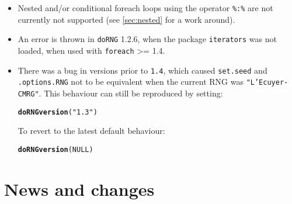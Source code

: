 \documentclass[a4paper,12pt]{article}\usepackage{graphicx, color}
\makeatletter
\newcommand{\hlfunctioncall}[1]{\textcolor[rgb]{0.501960784313725,0,0.329411764705882}{\textbf{#1}}}%
\newcommand{\hlstring}[1]{\textcolor[rgb]{0.6,0.6,1}{#1}}%
\newenvironment{kframe}{%
 \def\at@end@of@kframe{}%
 \ifinner\ifhmode%
  \def\at@end@of@kframe{\end{minipage}}%
  \begin{minipage}{\columnwidth}%
 \fi\fi%
 \def\FrameCommand##1{\hskip\@totalleftmargin \hskip-\fboxsep
 \colorbox{shadecolor}{##1}\hskip-\fboxsep
     \hskip-\linewidth \hskip-\@totalleftmargin \hskip\columnwidth}%
 \MakeFramed {\advance\hsize-\width
   \@totalleftmargin\z@ \linewidth\hsize
   \@setminipage}}%
 {\par\unskip\endMakeFramed%
 \at@end@of@kframe}
\newenvironment{knitrout}{}{} %
\renewenvironment{knitrout}{\begin{footnotesize}}{\end{footnotesize}}
\let\code=\texttt
\makeatother
\begin{document}
\begin{itemize}
\item Nested and/or conditional foreach loops using the operator \code{\%:\%} are not 
currently not supported (see \cref{sec:nested} for a work around).
\item An error is thrown in \code{doRNG} 1.2.6, when the package \code{iterators} was not loaded, when used with 
\code{foreach} >= 1.4.
\item There was a bug in versions prior to \code{1.4}, which caused \code{set.seed} and 
\code{.options.RNG} not to be equivalent when the current RNG was \code{"L'Ecuyer-CMRG"}.
This behaviour can still be reproduced by setting:
\begin{knitrout}
\color{fgcolor}\begin{kframe}
\begin{alltt}
\hlfunctioncall{doRNGversion}(\hlstring{"1.3"})
\end{alltt}
\end{kframe}
\end{knitrout}

To revert to the latest default behaviour:
\begin{knitrout}
\color{fgcolor}\begin{kframe}
\begin{alltt}
\hlfunctioncall{doRNGversion}(NULL)
\end{alltt}
\end{kframe}
\end{knitrout}

\end{itemize} 

\section{News and changes}
\end{document}

